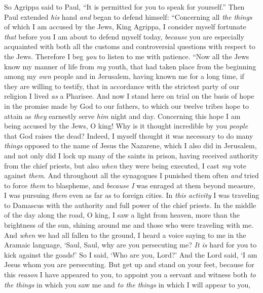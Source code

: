 \begin{biblechapter} %
 So Agrippa said to Paul, “It is permitted for you to speak for yourself.” Then Paul extended \textit{his} hand \textit{and} began to defend himself:
\verse “Concerning all \textit{the things} of which I am accused by the Jews, King Agrippa, I consider myself fortunate \textit{that} before you I am about to defend myself today,
\verse \textit{because} you are especially acquainted with both all the customs and controversial questions with respect to the Jews. Therefore I beg \textit{you} to listen to me with patience.
\verse “Now all the Jews know my manner of life from \textit{my} youth, that had taken place from the beginning among my \textit{own} people and in Jerusalem,
\verse having known me for a long time, if they are willing to testify, that in accordance with the strictest party of our religion I lived \textit{as} a Pharisee.
\verse And now I stand here on trial on the basis of hope in the promise made by God to our fathers,
\verse to which our twelve tribes hope to attain as \textit{they} earnestly serve \textit{him} night and day. Concerning this hope I am being accused by the Jews, O king!
\verse Why is it thought incredible by you \textit{people} that God raises the dead?
\verse Indeed, I myself thought it was necessary to do many \textit{things} opposed to the name of Jesus the Nazarene,
\verse which I also did in Jerusalem, and not only did I lock up many of the saints in prison, having received authority from the chief priests, but also \textit{when} they were being executed, I cast \textit{my} vote against \textit{them}.
\verse And throughout all the synagogues I punished them often \textit{and} tried to force \textit{them} to blaspheme, and \textit{because I} was enraged at them beyond measure, I was pursuing \textit{them} even as far as to foreign cities.
\verse In \textit{this activity} I was traveling to Damascus with the authority and full power of the chief priests.
\verse In the middle of the day along the road, O king, I saw a light from heaven, more than the brightness of the sun, shining around me and those who were traveling with me.
\verse And \textit{when} we had all fallen to the ground, I heard a voice saying to me in the Aramaic language, ‘Saul, Saul, why are you persecuting me? \textit{It is} hard for you to kick against the goads!’
\verse So I said, ‘Who are you, Lord?’ And the Lord said, ‘I am Jesus whom you are persecuting.
\verse But get up and stand on your feet, because for this \textit{reason} I have appeared to you, to appoint you a servant and witness both \textit{to the things} in which you saw me and \textit{to the things} in which I will appear to you,

\end{biblechapter}
